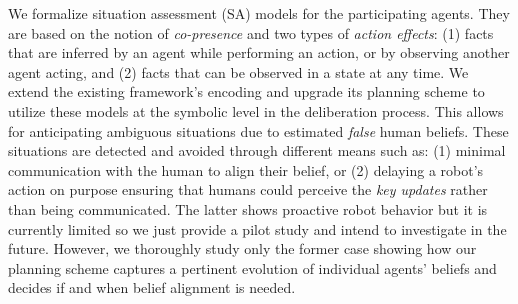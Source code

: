 \documentclass[letterpaper]{article} %
\begin{document}


We formalize situation assessment (SA) models for the participating agents. 
They are based on the notion of {\em co-presence} and two types of \textit{action effects}: (1) facts that are inferred by an agent while performing an action, or by observing another agent acting, and (2) facts that can be observed in a state at any time.
We extend the existing framework's encoding and upgrade its planning scheme to utilize these models at the symbolic level in the deliberation process. This allows for anticipating ambiguous situations due to estimated \textit{false} human beliefs. 
These situations are detected and avoided through different means such as: (1) minimal communication with the human to align their belief, or 
(2) delaying a robot's action on purpose ensuring that humans could perceive the {\em key updates} rather than being communicated.
The latter shows proactive robot behavior but it is currently limited so we just provide a pilot study and intend to investigate in the future. However, we thoroughly study only the former case showing how our planning scheme captures a pertinent evolution of individual agents' beliefs and decides if and when belief alignment is needed.
\end{document}

